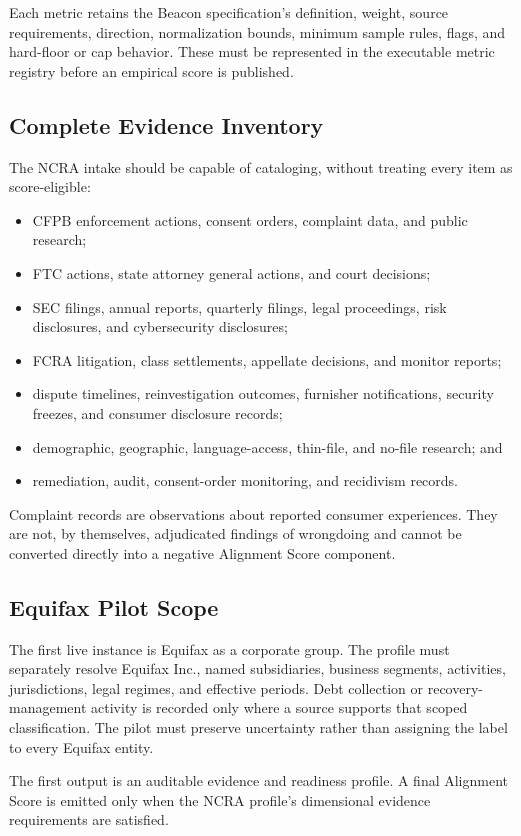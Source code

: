 Each metric retains the Beacon specification's definition, weight, source
requirements, direction, normalization bounds, minimum sample rules, flags,
and hard-floor or cap behavior. These must be represented in the executable
metric registry before an empirical score is published.

\subsection{Complete Evidence Inventory}

The NCRA intake should be capable of cataloging, without treating every item
as score-eligible:

\begin{itemize}
  \item CFPB enforcement actions, consent orders, complaint data, and public
        research;
  \item FTC actions, state attorney general actions, and court decisions;
  \item SEC filings, annual reports, quarterly filings, legal proceedings,
        risk disclosures, and cybersecurity disclosures;
  \item FCRA litigation, class settlements, appellate decisions, and monitor
        reports;
  \item dispute timelines, reinvestigation outcomes, furnisher notifications,
        security freezes, and consumer disclosure records;
  \item demographic, geographic, language-access, thin-file, and no-file
        research; and
  \item remediation, audit, consent-order monitoring, and recidivism records.
\end{itemize}

Complaint records are observations about reported consumer experiences. They
are not, by themselves, adjudicated findings of wrongdoing and cannot be
converted directly into a negative Alignment Score component.

\subsection{Equifax Pilot Scope}

The first live instance is Equifax as a corporate group. The profile must
separately resolve Equifax Inc., named subsidiaries, business segments,
activities, jurisdictions, legal regimes, and effective periods. Debt
collection or recovery-management activity is recorded only where a source
supports that scoped classification. The pilot must preserve uncertainty
rather than assigning the label to every Equifax entity.

The first output is an auditable evidence and readiness profile. A final
Alignment Score is emitted only when the NCRA profile's dimensional evidence
requirements are satisfied.
